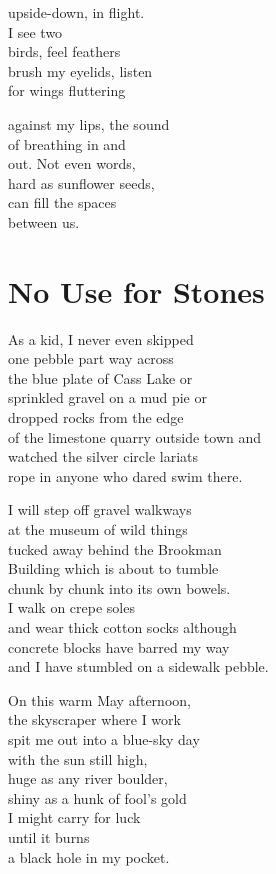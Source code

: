 \documentclass[twoside,10pt]{book}
\begin{document}
upside-down, in flight.\\
I see two\\
birds, feel feathers\\
brush my eyelids, listen\\
for wings fluttering

against my lips, the sound\\
of breathing in and\\
out. Not even words,\\
hard as sunflower seeds,\\
can fill the spaces\\
between us.


\clearpage
\section{No Use for Stones}

As a kid, I never even skipped\\
one pebble part way across\\
the blue plate of Cass Lake or\\
sprinkled gravel on a mud pie or\\
dropped rocks from the edge\\
of the limestone quarry outside town and\\
watched the silver circle lariats\\
rope in anyone who dared swim there.

I will step off gravel walkways\\
at the museum of wild things\\
tucked away behind the Brookman\\
Building which is about to tumble\\
chunk by chunk into its own bowels.\\
I walk on crepe soles\\
and wear thick cotton socks although\\
concrete blocks have barred my way\\
and I have stumbled on a sidewalk pebble.

On this warm May afternoon,\\
the skyscraper where I work\\
spit me out into a blue-sky day\\
with the sun still high,\\
huge as any river boulder,\\
shiny as a hunk of fool's gold\\
I might carry for luck\\
until it burns\\
a black hole in my pocket.
\end{document}
